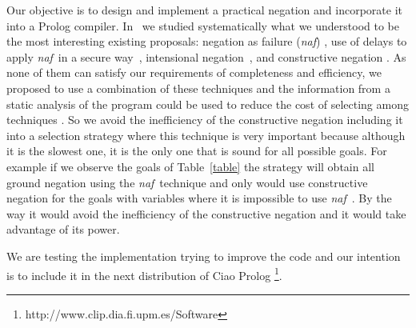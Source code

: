 \documentclass{llncs}
\newcommand{\naf}{{\em naf}}\newcommand{\viejo}[1]{}
\begin{document}
Our objective is to design and implement a practical negation and
incorporate it into a Prolog compiler.
In~\cite{SusanaPADL2000,SusanaPRODE00} we studied systematically what
we understood to be the most interesting existing proposals: negation
as failure (\naf) \cite{Clark}, use of delays to apply \naf\ in a
secure way~\cite{naish:lncs}, intensional
negation~\cite{Barbuti1,Barbuti2}, and constructive negation
\cite{Chan1,Chan2,Drabent,Stuckey,Stuckey95}. As none of them can
satisfy our requirements of completeness and efficiency, we proposed
to use a combination of these techniques and the information from a
static analysis of the program could be used to reduce the cost of
selecting among techniques \cite{SusanaLPAR01}. So we avoid the
inefficiency of the constructive negation including it into a
selection strategy where this technique is very important because
although it is the slowest one, it is the only one that is sound for
all possible goals. For example if we observe the goals of
Table~\ref{table} the strategy will obtain all ground negation using
the \naf\ technique and only would use constructive negation for the
goals with variables where it is impossible to use \naf\ . By the way
it would avoid the inefficiency of the constructive negation and it
would take advantage of its power.

We are testing the implementation trying to improve the code and our
intention is to include it in the next distribution of Ciao Prolog
\footnote{http://www.clip.dia.fi.upm.es/Software}.
  



     
    



\end{document}
